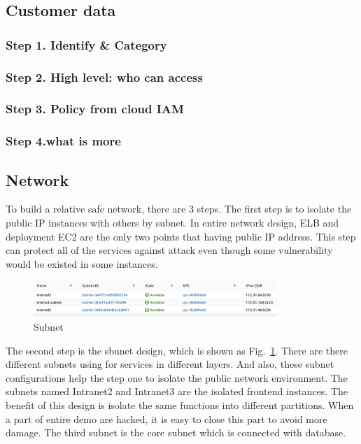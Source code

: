 \documentclass[conference]{IEEEtran}
\begin{document}
\subsection{Customer data}

\subsubsection{Step 1. Identify \& Category}

\subsubsection{Step 2. High level: who can access}
  
\subsubsection{Step 3. Policy from cloud IAM}

\subsubsection{Step 4.what is more}


\subsection{Network}

To build a relative safe network, there are 3 steps. The first step is to isolate the public IP instances with others by subnet. In entire network design, 
ELB and deployment EC2 are the only two points that having public IP address. This step can protect all of the services against attack even though some vulnerability 
would be existed in some instances.

\begin{figure}[htbp]
    \centerline{\includegraphics[width=260pt]{images/subnet.png}}
    \caption{Subnet}
    \label{subnet}
\end{figure}

The second step is the sbunet design, which is shown as Fig.~\ref{subnet}. There are there different subnets using for services in different layers. And also, 
these subnet configurations help the step one to isolate the public network environment. The subnets named Intranet2 and Intranet3 are the isolated frontend 
instances. The benefit of this design is isolate the same functions into different partitions. When a part of entire demo are hacked, it is easy 
to close this part to avoid more damage. The third subnet is the core subnet which is connected with database.
\end{document}
